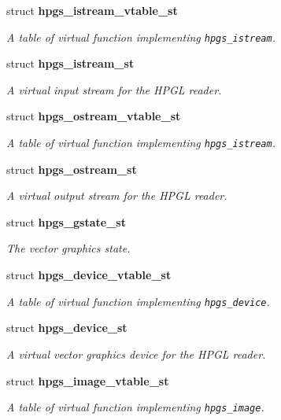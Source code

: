 \begin{CompactItemize}
struct {\bf hpgs\_\-istream\_\-vtable\_\-st}
\begin{CompactList}\small\item\em A table of virtual function implementing {\tt hpgs\_\-istream}. \item\end{CompactList}\item 
struct {\bf hpgs\_\-istream\_\-st}
\begin{CompactList}\small\item\em A virtual input stream for the HPGL reader. \item\end{CompactList}\item 
struct {\bf hpgs\_\-ostream\_\-vtable\_\-st}
\begin{CompactList}\small\item\em A table of virtual function implementing {\tt hpgs\_\-istream}. \item\end{CompactList}\item 
struct {\bf hpgs\_\-ostream\_\-st}
\begin{CompactList}\small\item\em A virtual output stream for the HPGL reader. \item\end{CompactList}\item 
struct {\bf hpgs\_\-gstate\_\-st}
\begin{CompactList}\small\item\em The vector graphics state. \item\end{CompactList}\item 
struct {\bf hpgs\_\-device\_\-vtable\_\-st}
\begin{CompactList}\small\item\em A table of virtual function implementing {\tt hpgs\_\-device}. \item\end{CompactList}\item 
struct {\bf hpgs\_\-device\_\-st}
\begin{CompactList}\small\item\em A virtual vector graphics device for the HPGL reader. \item\end{CompactList}\item 
struct {\bf hpgs\_\-image\_\-vtable\_\-st}
\begin{CompactList}\small\item\em A table of virtual function implementing {\tt hpgs\_\-image}. \item\end{CompactList}\item 

\end{CompactItemize}
